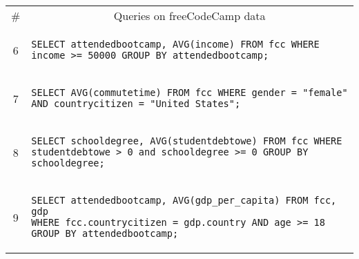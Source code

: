 {\begin{tabular}{cl}
\begin{minipage}{6in}
      \end{minipage}{queryno}\label[query]{q5}\\
  \midrule
  \# & \multicolumn{1}{c}{Queries on freeCodeCamp data} \\
  \midrule
  6 & 
      \begin{minipage}{6in}
\begin{lstlisting}[breaklines]
SELECT attendedbootcamp, AVG(income) FROM fcc WHERE income >= 50000 GROUP BY attendedbootcamp;
\end{lstlisting}
      \end{minipage}{queryno} \label[query]{q6} \\[-1.5ex]
  7 & 
      \begin{minipage}{6in}
\begin{lstlisting}[breaklines]
SELECT AVG(commutetime) FROM fcc WHERE gender = "female" AND countrycitizen = "United States";
\end{lstlisting}
      \end{minipage}{queryno} \label[query]{q7} \\[-1.5ex]
  8 & 
      \begin{minipage}{6in}
\begin{lstlisting}[breaklines]
SELECT schooldegree, AVG(studentdebtowe) FROM fcc WHERE studentdebtowe > 0 and schooldegree >= 0 GROUP BY schooldegree;
\end{lstlisting}
      \end{minipage}{queryno} \label[query]{q8}\\[-1.5ex]
  9 & 
      \begin{minipage}{6in}
\begin{lstlisting}[breaklines]
SELECT attendedbootcamp, AVG(gdp_per_capita) FROM fcc, gdp 
WHERE fcc.countrycitizen = gdp.country AND age >= 18 GROUP BY attendedbootcamp;
\end{lstlisting}
      \end{minipage}{queryno} \label[query]{q9}\\[-1.5ex]
  \bottomrule
\end{tabular}
}

